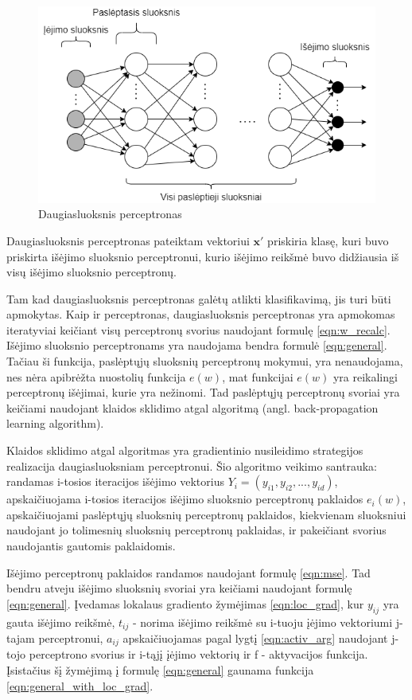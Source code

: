 \begin{figure}[H]
	\centering
	\includegraphics[scale=0.5]{img/neural_network.png}
	\caption{Daugiasluoksnis perceptronas}
	\label{img:nn}
\end{figure}

Daugiasluoksnis perceptronas pateiktam vektoriui $\boldsymbol{x}'$ priskiria klasę, kuri buvo priskirta išėjimo sluoksnio perceptronui, kurio išėjimo reikšmė buvo didžiausia iš visų išėjimo sluoksnio perceptronų.

Tam kad daugiasluoksnis perceptronas galėtų atlikti klasifikavimą, jis turi būti apmokytas. Kaip ir perceptronas, daugiasluoksnis perceptronas yra apmokomas iteratyviai keičiant visų perceptronų svorius naudojant formulę \ref{eqn:w_recalc}. Išėjimo sluoksnio perceptronams yra naudojama bendra formulė \ref{eqn:general}. Tačiau ši funkcija, paslėptųjų sluoksnių perceptronų mokymui, yra nenaudojama, nes nėra apibrėžta nuostolių funkcija $e(w)$, mat funkcijai $e(w)$ yra reikalingi perceptronų išėjimai, kurie yra nežinomi. Tad paslėptųjų perceptronų svoriai yra keičiami naudojant klaidos sklidimo atgal algoritmą (angl. back-propagation learning algorithm).

Klaidos sklidimo atgal algoritmas yra gradientinio nusileidimo strategijos realizacija daugiasluoksniam perceptronui. Šio algoritmo veikimo santrauka: randamas i-tosios iteracijos išėjimo vektorius $Y_i = (y_{i1}, y_{i2}, ..., y_{id})$, apskaičiuojama i-tosios iteracijos išėjimo sluoksnio perceptronų paklaidos $e_i(w)$, apskaičiuojami paslėptųjų sluoksnių perceptronų paklaidos, kiekvienam sluoksniui naudojant jo tolimesnių sluoksnių perceptronų paklaidas, ir pakeičiant svorius naudojantis gautomis paklaidomis.

Išėjimo perceptronų paklaidos randamos naudojant formulę \ref{eqn:mse}. Tad bendru atveju išėjimo sluoksnių svoriai yra keičiami naudojant formulę \ref{eqn:general}. Įvedamas lokalaus gradiento žymėjimas \ref{eqn:loc_grad}, kur $y_{ij}$ yra gauta išėjimo reikšmė, $t_{ij}$ - norima išėjimo reikšmė su i-tuoju įėjimo vektoriumi j-tajam perceptronui, $a_{ij}$ apskaičiuojamas pagal lygtį \ref{eqn:activ_arg} naudojant j-tojo perceptrono svorius ir i-tąjį įėjimo vektorių ir f - aktyvacijos funkcija. Įsistačius šį žymėjimą į formulę \ref{eqn:general} gaunama funkcija \ref{eqn:general_with_loc_grad}.

